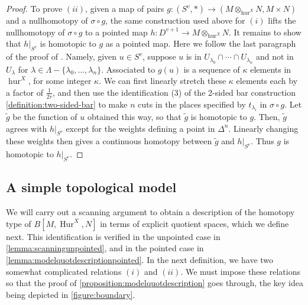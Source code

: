 \documentclass[12 pt]{amsart}
\theoremstyle{plain}
\theoremstyle{definition}
\theoremstyle{remark}
\numberwithin{equation}{section}
\DeclareMathOperator\Hur{Hur}
\begin{document}
\begin{proof}
	To prove $(ii)$, given a map of pairs $g:(S^v,*) \to
	(M\otimes_{\operatorname{hur}^{X}}N,M\times N)$ and a nullhomotopy of
	$\sigma \circ g$,
	the same construction used above for $(i)$ lifts the nullhomotopy of
	$\sigma \circ g$ to a pointed map $h:D^{v+1} \to
	M\otimes_{\operatorname{hur}^{X}}N$. It remains to show that $h|_{S^v}$
	is homotopic to $g$ as a pointed map. Here we follow the last paragraph
	of the proof of \cite[Theorem
	5.2.3]{bergstromDPW:hyperelliptic-curves-the-scanning-map}. Namely,
	given $u \in S^v$, suppose $u$ is in $U_{\lambda_0}\cap\cdots\cap
	U_{\lambda_n}$ and not in $U_{\lambda}$ for $\lambda \in
	\Lambda - \{\lambda_0, \ldots, \lambda_n\}$. Associated to $g(u)$ is a
	sequence of $\kappa$
	elements in $\operatorname{hur}^{X}$, for some integer $\kappa$. We can first linearly stretch
	these $\kappa$ elements each by a factor of $\frac 1 {2r}$, and then use
	the identification (3) of the 2-sided bar construction
	\autoref{definition:two-sided-bar}
to make $n$ cuts in
the places specified by $t_{\lambda_i}$ in $\sigma \circ g$. Let $\tilde{g}$ be
the function of $u$ obtained this way, so that $\tilde{g}$ is homotopic to $g$.
Then, $\tilde{g}$ agrees with $h|_{S^v}$ except for the weights defining a point in $\Delta^n$. Linearly changing these weights then gives a continuous homotopy between $\tilde{g}$ and $h|_{S^v}$. Thus $g$ is homotopic to $h|_{S^v}$.
\end{proof}
\subsection{A simple topological model}
We will carry out a scanning argument to obtain a description of the homotopy type of
$B[M,\Hur^{X},N]$ in terms of explicit quotient spaces, which we define next.
This identification is verified in
the unpointed case in
\autoref{lemma:scanningunpointed},
and in the pointed case in
\autoref{lemma:modelquotdescriptionpointed}.
In the next definition, we have two somewhat complicated relations $(i)$ and
$(ii)$.
We must impose these relations so that
the proof of
\autoref{proposition:modelquotdescription}
goes through, the key idea being depicted in
\autoref{figure:boundary}.
\end{document}
